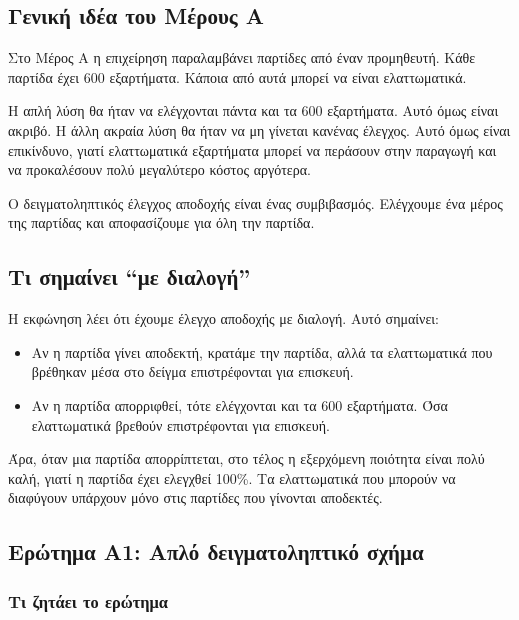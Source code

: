 \documentclass[12pt,a4paper]{article}
\begin{document}
\subsection{Γενική ιδέα του Μέρους Α}

Στο Μέρος Α η επιχείρηση παραλαμβάνει παρτίδες από έναν προμηθευτή. Κάθε
παρτίδα έχει \(600\) εξαρτήματα. Κάποια από αυτά μπορεί να είναι ελαττωματικά.

Η απλή λύση θα ήταν να ελέγχονται πάντα και τα 600 εξαρτήματα. Αυτό όμως είναι
ακριβό. Η άλλη ακραία λύση θα ήταν να μη γίνεται κανένας έλεγχος. Αυτό όμως
είναι επικίνδυνο, γιατί ελαττωματικά εξαρτήματα μπορεί να περάσουν στην
παραγωγή και να προκαλέσουν πολύ μεγαλύτερο κόστος αργότερα.

Ο δειγματοληπτικός έλεγχος αποδοχής είναι ένας συμβιβασμός. Ελέγχουμε ένα
μέρος της παρτίδας και αποφασίζουμε για όλη την παρτίδα.

\subsection{Τι σημαίνει ``με διαλογή''}

Η εκφώνηση λέει ότι έχουμε έλεγχο αποδοχής με διαλογή. Αυτό σημαίνει:

\begin{itemize}
    \item Αν η παρτίδα γίνει αποδεκτή, κρατάμε την παρτίδα, αλλά τα
    ελαττωματικά που βρέθηκαν μέσα στο δείγμα επιστρέφονται για επισκευή.
    \item Αν η παρτίδα απορριφθεί, τότε ελέγχονται και τα 600 εξαρτήματα.
    Όσα ελαττωματικά βρεθούν επιστρέφονται για επισκευή.
\end{itemize}

Άρα, όταν μια παρτίδα απορρίπτεται, στο τέλος η εξερχόμενη ποιότητα είναι πολύ
καλή, γιατί η παρτίδα έχει ελεγχθεί 100\%. Τα ελαττωματικά που μπορούν να
διαφύγουν υπάρχουν μόνο στις παρτίδες που γίνονται αποδεκτές.

\subsection{Ερώτημα Α1: Απλό δειγματοληπτικό σχήμα}

\subsubsection*{Τι ζητάει το ερώτημα}
\end{document}
